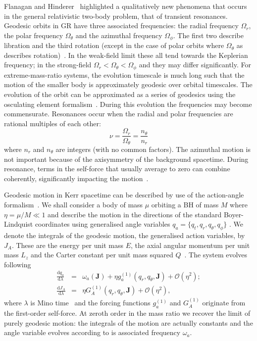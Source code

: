 \documentclass[aps,prd,amsfonts,amssymb,amsmath,nofootinbib,reprint,showpacs]{revtex4-1}
\newcommand{\dd}{\ensuremath{\text{d}}}
\newcommand{\diff}[2]{\ensuremath{\frac{\dd {#1}}{\dd {#2}}}}
\newcommand{\order}[1]{\ensuremath{\mathcal{O}({#1})}}
\begin{document}
Flanagan and Hinderer~\cite{Flanagan2012} highlighted a qualitatively new phenomena that occurs in the general relativistic two-body problem, that of transient resonances. Geodesic orbits in GR have three associated frequencies: the radial frequency $\Omega_r$, the polar frequency $\Omega_\theta$ and the azimuthal frequency $\Omega_\phi$. The first two describe libration and the third rotation (except in the case of polar orbits where $\Omega_\theta$ as describes rotation)~\cite{Goldstein2002}. %
In the weak-field limit these all tend towards the Keplerian frequency; in the strong-field $\Omega_r < \Omega_\theta < \Omega_\phi$ and they may differ significantly. For extreme-mass-ratio systems, the evolution timescale is much long such that the motion of the smaller body is approximately geodesic over orbital timescales. The evolution of the orbit can be approximated as a series of geodesics using the osculating element formalism~\cite{Pound2008,Gair2011a}. During this evolution the frequencies may become commensurate. Resonances occur when the radial and polar frequencies are rational multiples of each other:
\begin{equation}
\nu = \frac{\Omega_r}{\Omega_\theta} = \frac{n_\theta}{n_r}
\end{equation}
where $n_r$ and $n_\theta$ are integers (with no common factors). The azimuthal motion is not important because of the axisymmetry of the background spacetime. During resonance, terms in the self-force that usually average to zero can combine coherently, significantly impacting the motion~\cite{Flanagan2012a}.

Geodesic motion in Kerr spacetime can be described by use of the action-angle formalism~\cite{Goldstein2002}. %
We shall consider a body of mass $\mu$ orbiting a BH of mass $M$ where $\eta = \mu/M \ll 1$ and describe the motion in the directions of the standard Boyer-Lindquist coordinates using generalised angle variables $q_a = \{q_t,q_r,q_\theta,q_\phi\}$ \citep{Hinderer2008}. We denote the integrals of the geodesic motion, the generalised action variables, by $J_A$. These are the energy per unit mass $E$, the axial angular momentum per unit mass $L_z$ and the Carter constant per unit mass squared $Q$~\cite{Carter1968}. The system evolves following~\cite{Flanagan2012}
\begin{subequations}
\begin{eqnarray}
\diff{q_a}{\lambda} & = & \omega_a(\boldsymbol{J}) + \eta g_a^{(1)}(q_r,q_\theta,\boldsymbol{J}) + \order{\eta^2}; \\
\diff{J_A}{\lambda} & = & \eta G_A^{(1)}(q_r,q_\theta,\boldsymbol{J}) + \order{\eta^2},
\end{eqnarray}
\end{subequations}
where $\lambda$ is Mino time~\cite{Mino2003} and the forcing functions $g_a^{(1)}$ and $G_A^{(1)}$ originate from the first-order self-force. At zeroth order in the mass ratio we recover the limit of purely geodesic motion: the integrals of the motion are actually constants and the angle variable evolves according to is associated frequency $\omega_a$.
\end{document}
